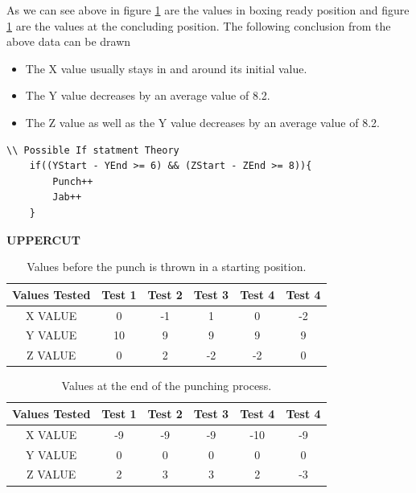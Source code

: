 \documentclass[a4paper,12pt]{report}
\begin{document}
As we can see above in figure \ref{tab:uppercutBeforet} are the values in boxing ready position and  figure \ref{tab:uppercutBeforet} are the values at the concluding position.
The following conclusion from the above data can be drawn 
\begin{itemize}
    \item The X value usually stays in and around its initial value.
    \item The Y value decreases by an average value of 8.2.
    \item The Z value as well as the Y value decreases by an average value of 8.2.
\end{itemize}
\newpage
\begin{verbatim}
\\ Possible If statment Theory
    if((YStart - YEnd >= 6) && (ZStart - ZEnd >= 8)){
        Punch++
        Jab++
    }
\end{verbatim}


\begin{center}
    \textbf{UPPERCUT}
\end{center}{}
\begin{table}[h]
    \centering
    \begin{tabular}{||c c c c c c||} 
     \hline
     \textbf{Values Tested} & \textbf{Test 1} & \textbf{Test 2} & \textbf{Test 3} & \textbf{Test 4} & \textbf{Test 4} \\ [0.5ex] 
     \hline\hline
     X VALUE & 0 & -1 & 1 & 0 & -2\\ 
     \hline
     Y VALUE & 10 & 9 & 9 & 9 & 9\\  
     \hline
     Z VALUE & 0 & 2 & -2 & -2 & 0\\
     \hline
    \end{tabular}
    \caption{Values before the punch is thrown in a starting position.}
    \label{tab:uppercutBeforet}
\end{table}

\begin{table}[h]
    \centering
    \begin{tabular}{||c c c c c c||} 
     \hline
     \textbf{Values Tested} & \textbf{Test 1} & \textbf{Test 2} & \textbf{Test 3} & \textbf{Test 4} & \textbf{Test 4} \\ [0.5ex] 
     \hline\hline
     X VALUE & -9 & -9 & -9 & -10 & -9\\ 
     \hline
     Y VALUE & 0 & 0 & 0 & 0 & 0\\  
     \hline
     Z VALUE & 2 & 3 & 3 & 2 & -3\\
     \hline
    \end{tabular}
    \caption{Values at the end of the punching process.}
    \label{tab:vAfter}
\end{table}
\end{document}

